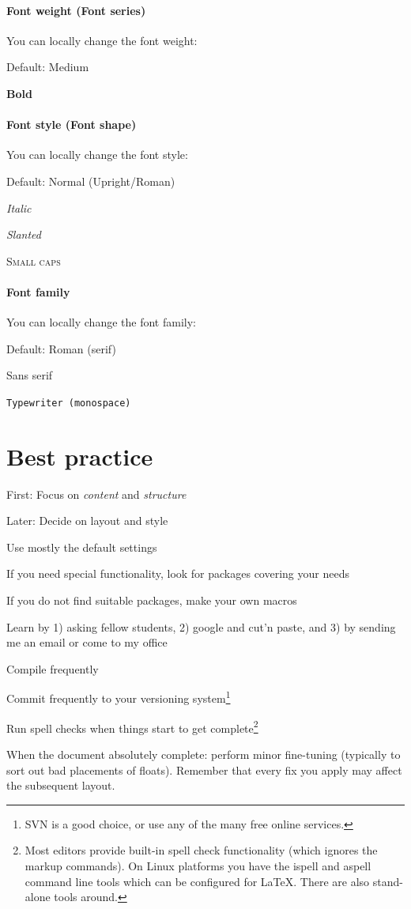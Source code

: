 \paragraph{Font weight (Font series)}
You can locally change the font weight:
    
    \textmd{Default: Medium}
    
    \textbf{Bold}
    
    
\paragraph{Font style (Font shape)}
You can locally change the font style:
    
    \textup{Default: Normal (Upright/Roman)}
    
    \textit{Italic}
    
    \textsl{Slanted}
    
    \textsc{Small caps}
    
\paragraph{Font family}
You can locally change the font family:
    
    \textrm{Default: Roman (serif)}
    
    \textsf{Sans serif}
    
    \texttt{Typewriter (monospace)}


\section{Best practice}
\label{sec:bestpractise}

\begin{compactitem}
\item First: Focus on {\em content} and {\em structure} 
\item Later: Decide on layout and style
\item Use mostly the default settings
\item If you need special functionality, look for packages covering your needs
\item If you do not find suitable packages, make your own macros
\item Learn by 1) asking fellow students, 2) google and cut'n paste, and 3) by sending me an email or come to my office
\item Compile frequently
\item Commit frequently to your versioning system\footnote{SVN is a good choice, or use any of the many free online services.}
\item Run spell checks when things start to get complete\footnote{Most editors provide built-in spell check functionality (which ignores the markup commands).  On Linux platforms you have the ispell and aspell command line tools which can be configured for \LaTeX. There are also stand-alone tools around.}
\item When the document absolutely complete: perform minor fine-tuning (typically to sort out bad placements of floats). Remember that every fix you apply may affect the subsequent layout.
\end{compactitem}




